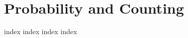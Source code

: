 \chapter{Probability and Counting}
\label{ch:pac}
\ifdefined\HCode
\else
{
\startcontents[chapter]
}
\fi

{index}
{index}
{index}
{index}

\ifdefined\HCode
{}
\fi

\ifdefined\HCode
\else
{
\stopcontents[chapter]
}
\fi